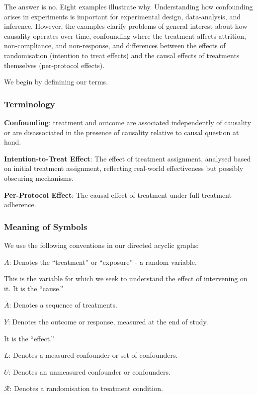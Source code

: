 \documentclass[
  single column]{article}
\begin{document}
The answer is no. Eight examples illustrate why. Understanding how
confounding arises in experiments is important for experimental design,
data-analysis, and inference. However, the examples clarify problems of
general interest about how causality operates over time, confounding
where the treatment affects attrition, non-compliance, and non-response,
and differences between the effects of randomisation (intention to treat
effects) and the causal effects of treatments themselves (per-protocol
effects).

We begin by definining our terms.

\subsubsection{Terminology}\label{terminology}

\textbf{Confounding}: treatment and outcome are associated independently
of causality or are disassociated in the presence of causality relative
to causal question at hand.

\textbf{Intention-to-Treat Effect}: The effect of treatment assignment,
analysed based on initial treatment assignment, reflecting real-world
effectiveness but possibly obscuring mechanisms.

\textbf{Per-Protocol Effect}: The causal effect of treatment under full
treatment adherence.

\subsubsection{Meaning of Symbols}\label{meaning-of-symbols}

We use the following conventions in our directed acyclic graphs:

\textbf{\(A\)}: Denotes the ``treatment'' or ``exposure'' - a random
variable.

This is the variable for which we seek to understand the effect of
intervening on it. It is the ``cause.''

\textbf{\(\bar{A}\)}: Denotes a sequence of treatments.

\textbf{\(Y\)}: Denotes the outcome or response, measured at the end of
study.

It is the ``effect.''

\textbf{\(L\)}: Denotes a measured confounder or set of confounders.

\textbf{\(U\)}: Denotes an unmeasured confounder or confounders.

\textbf{\(\mathcal{R}\)}: Denotes a randomisation to treatment
condition.
\end{document}
